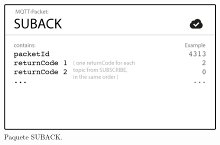 \documentclass[12pt, twoside]{book}
\begin{document}
\begin{figure}[H]
\centering
\includegraphics[scale=0.3]{images/suback_packet.png}
\caption{Paquete SUBACK.\cite{hive}}\label{L405}
\end{figure}
\end{document}
